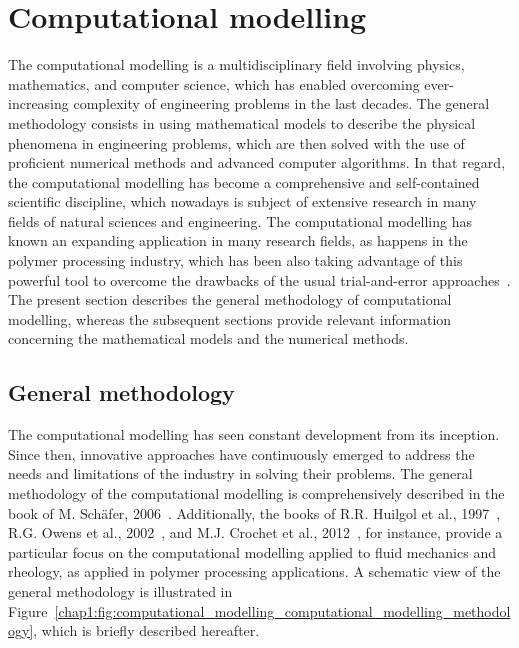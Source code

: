 \section{Computational modelling}
\label{chap1:sec:computational_modelling}

The computational modelling is a multidisciplinary field involving physics, mathematics, and computer science, which has enabled overcoming ever-increasing complexity of engineering problems in the last decades.
The general methodology consists in using mathematical models to describe the physical phenomena in engineering problems, which are then solved with the use of proficient numerical methods and advanced computer algorithms.
In that regard, the computational modelling has become a comprehensive and self-contained scientific discipline, which nowadays is subject of extensive research in many fields of natural sciences and engineering.
The computational modelling has known an expanding application in many research fields, as happens in the polymer processing industry, which has been also taking advantage of this powerful tool to overcome the drawbacks of the usual trial-and-error approaches~\cite{chap1:1998lin,chap1:2000nizami,chap1:2003smith,chap1:2004nobrega,chap1:2006nobrega,chap1:2008nobrega,chap1:2014yang,chap1:2016marques,chap1:2017marques1,chap1:2016habla}.
The present section describes the general methodology of computational modelling, whereas the subsequent sections provide relevant information concerning the mathematical models and the numerical methods.

\subsection{General methodology}
\label{chap1:subsec:computational_modelling_general_methodology}

The computational modelling has seen constant development from its inception.
Since then, innovative approaches have continuously emerged to address the needs and limitations of the industry in solving their problems.
The general methodology of the computational modelling is comprehensively described in the book of M. Sch\"afer, 2006~\cite{chap1:2006schafer}.
Additionally, the books of R.R. Huilgol et al., 1997~\cite{chap1:1997huilgol}, R.G. Owens et al., 2002~\cite{chap1:2002owens}, and M.J. Crochet et al., 2012~\cite{chap1:2012crochet}, for instance, provide a particular focus on the computational modelling applied to fluid mechanics and rheology, as applied in polymer processing applications.
A schematic view of the general methodology is illustrated in Figure~\ref{chap1:fig:computational_modelling_computational_modelling_methodology}, which is briefly described hereafter.

